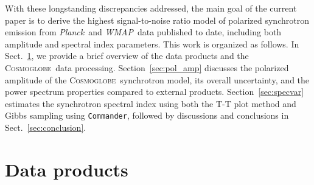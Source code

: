 \documentclass[twocolumn]{../../common/aa}
\def\WMAP{\emph{WMAP}}
\def\Planck{\emph{Planck}}
\def\commander{\texttt{Commander}}
\newcommand{\cosmoglobe}{\textsc{Cosmoglobe}}
\begin{document}
With these longstanding discrepancies addressed, the main goal of the current paper is to derive the highest signal-to-noise ratio model of polarized synchrotron emission from \Planck\ and \WMAP\ data published to date, including both amplitude and spectral index parameters. This work is organized as follows. In Sect.~\ref{sec:data}, we provide a brief overview of the data products and the \cosmoglobe\ data processing. Section~\ref{sec:pol_amp} discusses the polarized amplitude of the \cosmoglobe\ synchrotron model, its overall uncertainty, and the power spectrum properties compared to external products. Section~\ref{sec:specvar} estimates the synchrotron spectral index using both the T-T plot method and Gibbs sampling using \commander, followed by discussions and conclusions in Sect.~\ref{sec:conclusion}.







\section{Data products}
\label{sec:data}
\end{document}

